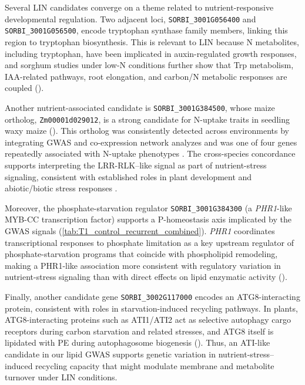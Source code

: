 \documentclass[9pt,twocolumn,twoside]{rilabRxiv}
\begin{document}
Several LIN candidates converge on a theme related to nutrient-responsive developmental regulation. Two adjacent loci, \texttt{SORBI\_3001G056400} and \texttt{SORBI\_3001G056500}, encode tryptophan synthase family members, linking this region to tryptophan biosynthesis. This is relevant to LIN because N metabolites, including tryptophan, have been implicated in auxin-regulated growth responses, and sorghum studies under low-N conditions further show that Trp metabolism, IAA-related pathways, root elongation, and carbon/N metabolic responses are coupled (\cite{Stepanova2008,Zhao2001,Fu2022,Liu2024,Wang2025}).

Another nutrient-associated candidate is \texttt{SORBI\_3001G384500}, whose maize ortholog, \texttt{Zm00001d029012}, is a strong candidate for N-uptake traits in seedling waxy maize (\cite{Gladman2022SorghumBase}). This ortholog was consistently detected across environments by integrating GWAS and co-expression network analyzes and was one of four genes repeatedly associated with N-uptake phenotypes \citep{Luo2025}. The cross-species concordance supports interpreting the LRR-RLK–like signal as part of nutrient-stress signaling, consistent with established roles in plant development and abiotic/biotic stress responses \citep{Dufayard2017}.

Moreover, the phosphate-starvation regulator \texttt{SORBI\_3001G384300} (a \textit{PHR1}-like MYB-CC transcription factor) supports a P-homeostasis axis implicated by the GWAS signals (\ref{tab:T1_control_recurrent_combined}). \textit{PHR1} coordinates transcriptional responses to phosphate limitation as a key upstream regulator of phosphate-starvation programs that coincide with phospholipid remodeling, making a PHR1-like association more consistent with regulatory variation in nutrient-stress signaling than with direct effects on lipid enzymatic activity (\cite{Pant2015,Rubio2001,Bustos2010,Nilsson2007,Rouached2011}).

Finally, another candidate gene \texttt{SORBI\_3002G117000} encodes an ATG8-interacting protein, consistent with roles in starvation-induced recycling pathways. In plants, ATG8-interacting proteins such as ATI1/ATI2 act as selective autophagy cargo receptors during carbon starvation and related stresses, and ATG8 itself is lipidated with PE during autophagosome biogenesis (\cite{Honig2012,Wu2021ATI,Michaeli2014}). Thus, an ATI-like candidate in our lipid GWAS supports genetic variation in nutrient-stress–induced recycling capacity that might modulate membrane and metabolite turnover under LIN conditions.
\end{document}
